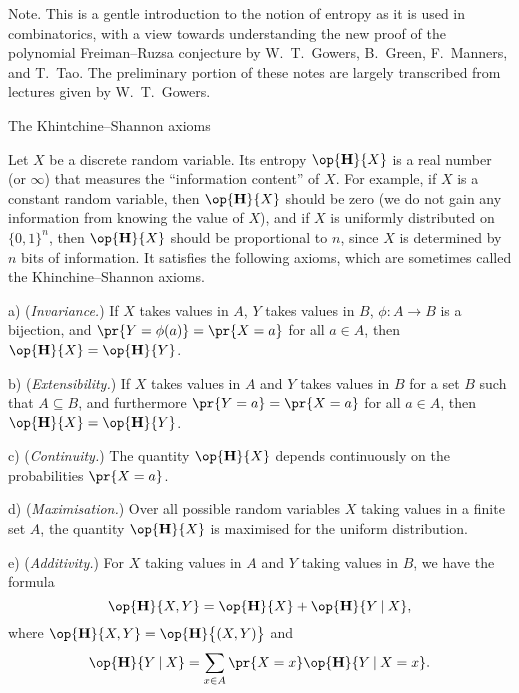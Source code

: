 


\def\eps{\epsilon}
\def\FF{{\bf F}}
\def\bar#1{\overline{#1}}
\def\hat#1{\widehat{#1}}
\def\norm#1{|\!|#1|\!|}
\def\bignorm#1{\big|\!\big|#1\big|\!\big|}
\def\Norm#1{\Big|\!\Big|#1\Big|\!\Big|}
\def\normm#1{\bigg|\!\bigg|#1\bigg|\!\bigg|}
\def\Bohr{\op{\rm Bohr}}
\def\Eta{\op{\bf H}}
\def\II{\op{\bf I}}
\def\given{\mathbin{|}}

\widemargins
{}


 \ninebf Note.
\ninepoint This is a gentle introduction to the notion of entropy as it is used
in combinatorics, with a view towards understanding the new proof of the polynomial Freiman--Ruzsa
conjecture by W.~T.~Gowers, B.~Green, F.~Manners, and T.~Tao. The preliminary portion of
these notes are largely transcribed from lectures given by W.~T.~Gowers.

\bigskip

\advsect The Khintchine--Shannon axioms

Let $X$ be a discrete random variable. Its entropy $\Eta\{X\}$ is a real number
(or $\infty$) that measures the ``information content'' of $X$. For example, if $X$ is
a constant random variable, then $\Eta\{X\}$ should be zero (we do not gain any information
from knowing the value of $X$), and if $X$ is
uniformly distributed on $\{0,1\}^n$, then $\Eta\{X\}$ should be proportional to $n$, since $X$ is
determined by
$n$ bits of information. It satisfies the following axioms, which are
sometimes called the Khinchine--Shannon axioms.
\medskip
\item{a)} ({\it Invariance.}) If $X$ takes values in $A$, $Y$ takes values in $B$,
$\phi:A\to B$ is a bijection, and $\pr\{Y = \phi(a)\} = \pr\{X = a\}$ for all $a\in A$,
then $\Eta\{X\} = \Eta\{Y\}$.
\smallskip
\item{b)} ({\it Extensibility.}) If $X$ takes values in $A$ and $Y$ takes values in $B$ for
a set $B$ such that $A\subseteq B$, and furthermore $\pr\{Y=a\} = \pr\{X=a\}$ for all $a\in A$,
then $\Eta\{X\} = \Eta\{Y\}$.
\smallskip
\item{c)} ({\it Continuity.}) The quantity $\Eta\{X\}$ depends continuously on the probabilities
$\pr\{X=a\}$.
\smallskip
\item{d)} ({\it Maximisation.}) Over all possible random variables $X$ taking values in a finite
set $A$, the quantity $\Eta\{X\}$ is maximised for the uniform distribution.
\smallskip
\item{e)} ({\it Additivity.})
For $X$ taking values in $A$ and $Y$ taking values in $B$, we have the formula
$$ \Eta\{X,Y\} = \Eta\{X\} + \Eta\{ Y \given X\},$$
where $\Eta\{X,Y\} = \Eta\bigl\{ (X,Y)\bigr\}$ and
$$ \Eta\{Y\given X\} = \sum_{x\in A} \pr\{X=x\} \Eta\{ Y\given X = x\}.$$
\medskip

